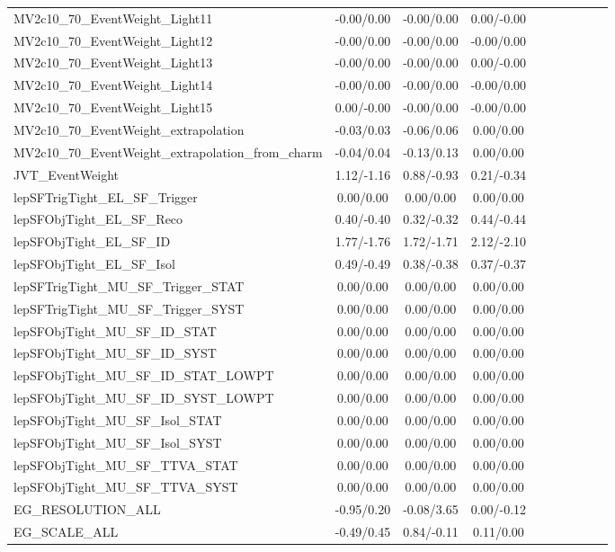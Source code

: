 \begin{table}[h]
\begin{center}
\begin{tabular}{l|ccccccccc}
MV2c10\_70\_EventWeight\_Light11 &-0.00/0.00 &-0.00/0.00 &0.00/-0.00 \\
MV2c10\_70\_EventWeight\_Light12 &-0.00/0.00 &-0.00/0.00 &-0.00/0.00 \\
MV2c10\_70\_EventWeight\_Light13 &-0.00/0.00 &-0.00/0.00 &0.00/-0.00 \\
MV2c10\_70\_EventWeight\_Light14 &-0.00/0.00 &-0.00/0.00 &-0.00/0.00 \\
MV2c10\_70\_EventWeight\_Light15 &0.00/-0.00 &-0.00/0.00 &-0.00/0.00 \\
MV2c10\_70\_EventWeight\_extrapolation &-0.03/0.03 &-0.06/0.06 &0.00/0.00 \\
MV2c10\_70\_EventWeight\_extrapolation\_from\_charm &-0.04/0.04 &-0.13/0.13 &0.00/0.00 \\
JVT\_EventWeight &1.12/-1.16 &0.88/-0.93 &0.21/-0.34 \\
lepSFTrigTight\_EL\_SF\_Trigger &0.00/0.00 &0.00/0.00 &0.00/0.00 \\
lepSFObjTight\_EL\_SF\_Reco &0.40/-0.40 &0.32/-0.32 &0.44/-0.44 \\
lepSFObjTight\_EL\_SF\_ID &1.77/-1.76 &1.72/-1.71 &2.12/-2.10 \\
lepSFObjTight\_EL\_SF\_Isol &0.49/-0.49 &0.38/-0.38 &0.37/-0.37 \\
lepSFTrigTight\_MU\_SF\_Trigger\_STAT &0.00/0.00 &0.00/0.00 &0.00/0.00 \\
lepSFTrigTight\_MU\_SF\_Trigger\_SYST &0.00/0.00 &0.00/0.00 &0.00/0.00 \\
lepSFObjTight\_MU\_SF\_ID\_STAT &0.00/0.00 &0.00/0.00 &0.00/0.00 \\
lepSFObjTight\_MU\_SF\_ID\_SYST &0.00/0.00 &0.00/0.00 &0.00/0.00 \\
lepSFObjTight\_MU\_SF\_ID\_STAT\_LOWPT &0.00/0.00 &0.00/0.00 &0.00/0.00 \\
lepSFObjTight\_MU\_SF\_ID\_SYST\_LOWPT &0.00/0.00 &0.00/0.00 &0.00/0.00 \\
lepSFObjTight\_MU\_SF\_Isol\_STAT &0.00/0.00 &0.00/0.00 &0.00/0.00 \\
lepSFObjTight\_MU\_SF\_Isol\_SYST &0.00/0.00 &0.00/0.00 &0.00/0.00 \\
lepSFObjTight\_MU\_SF\_TTVA\_STAT &0.00/0.00 &0.00/0.00 &0.00/0.00 \\
lepSFObjTight\_MU\_SF\_TTVA\_SYST &0.00/0.00 &0.00/0.00 &0.00/0.00 \\
EG\_RESOLUTION\_ALL &-0.95/0.20 &-0.08/3.65 &0.00/-0.12 \\
EG\_SCALE\_ALL &-0.49/0.45 &0.84/-0.11 &0.11/0.00 \\

\end{tabular}
\end{center}
\end{table}
